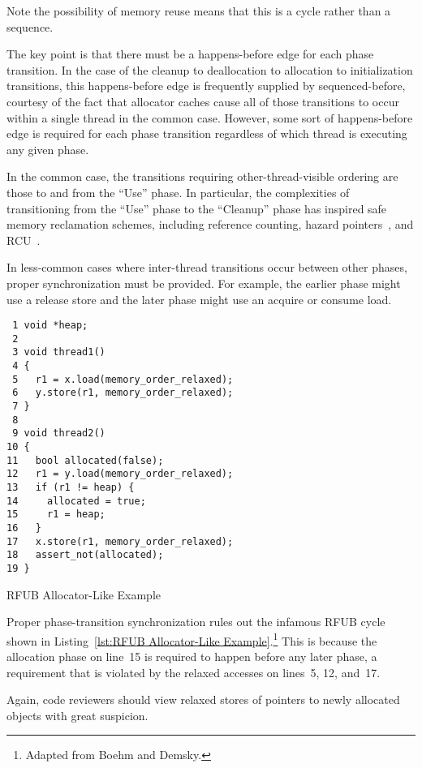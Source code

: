 \documentclass[10]{article}
\begin{document}
Note the possibility of memory reuse means that this is a cycle rather
than a sequence.

The key point is that there must be a happens-before edge for each
phase transition.
In the case of the cleanup to deallocation to allocation to initialization
transitions, this happens-before edge is frequently supplied by
sequenced-before, courtesy of the fact that allocator caches cause
all of those transitions to occur within a single thread in the common
case.
However, some sort of happens-before edge is required for each phase
transition regardless of which thread is executing any given phase.

In the common case, the transitions requiring other-thread-visible ordering
are those to and from the ``Use'' phase.
In particular, the complexities of transitioning from the ``Use'' phase
to the ``Cleanup'' phase has inspired safe memory reclamation schemes,
including reference counting,
hazard pointers~\cite{Michael02a,HerlihyLM02,MagedMichael04a},
and RCU~\cite{McKenney98}.

In less-common cases where inter-thread transitions occur between other
phases, proper synchronization must be provided.
For example, the earlier phase might use a release store and
the later phase might use an acquire or consume load.

\begin{listing}[tbp]
\begin{verbatim}
 1 void *heap;
 2
 3 void thread1()
 4 {
 5   r1 = x.load(memory_order_relaxed);
 6   y.store(r1, memory_order_relaxed);
 7 }
 8
 9 void thread2()
10 {
11   bool allocated(false);
12   r1 = y.load(memory_order_relaxed);
13   if (r1 != heap) {
14     allocated = true;
15     r1 = heap;
16   }
17   x.store(r1, memory_order_relaxed);
18   assert_not(allocated);
19 }
\end{verbatim}
\caption{RFUB Allocator-Like Example}
\label{lst:RFUB Allocator-Like Example}
\end{listing}

Proper phase-transition synchronization rules out the infamous RFUB
cycle shown in Listing~\ref{lst:RFUB Allocator-Like Example}.\footnote{
	Adapted from Boehm and
	Demsky\cite[Figure 5]{Boehm:2014:OGA:2618128.2618134}.}
This is because the allocation phase on line~15 is required to happen
before any later phase, a requirement that is violated by the relaxed
accesses on lines~5, 12, and~17.

Again, code reviewers should view relaxed stores of pointers to newly
allocated objects with great suspicion.
\end{document}
